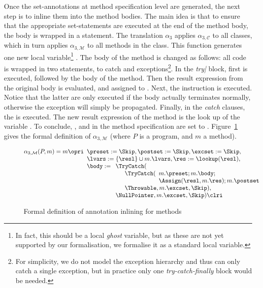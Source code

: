 Once the set-annotations at method specification level are generated,
the next step is to inline them into the method bodies.  The main
idea is that to ensure that the appropriate set-statements are
executed at the end of the method body, the body is wrapped in a
\TryCatch statement. The translation \(\alpha_3\) applies
\(\alpha_{3, \mathcal{C}}\) to all classes, which in turn applies
\(\alpha_{3, \mathcal{M}}\) to all methods in the class. This function
generates one new local variable\footnote{In fact, this should be a
local \emph{ghost} variable, but as these are not yet supported by our
formalisation, we formalise it as a standard local variable.}
\resl. The body of the method is changed as follows: 
all code is wrapped in two \TryCatch statements, to catch \Throwable
and \NullPointer exceptions\footnote{For simplicity, we do not model
the exception hierarchy and thus \TryCatch can only catch a single
exception, but in practice only one \emph{try-catch-finally} block
would be needed.}. In the \emph{try|} block, first \preset is
executed, followed by the body of the method. Then the result
expression from the original body is evaluated, and assigned to
\resl. Next, the \postset instruction is executed. Notice that the latter
are only executed if the body actually terminates normally, otherwise
the exception will simply be propagated. Finally, in the \emph{catch}
clauses, the \excset is executed. The new result expression of the method
is the look up of the variable \resl. To conclude, \preset,
\postset and
\excset in the method specification are set to
\Skip. Figure~\ref{FigInline} gives the formal definition of
\(\alpha_{3, \mathcal{M}}\) (where \(P\) is a program, and \(m\) a method).

\begin{figure}[t]
\[
\alpha_{3, \mathcal{M}}(P, m) = m \opri
\begin{array}[t]{l}
\preset := \Skip, \postset := \Skip, \excset := \Skip,\\
\lvars := \{\resl\} \cup m.\lvars,
\res := \lookup(\resl), \\
\body :=
\begin{array}[t]{l}
\TryCatch(\\
\quad \begin{array}[t]{l}
  \TryCatch(
  \begin{array}[t]{l}
   m.\preset; m.\body; \\ \Assign(\resl, m.\res); m.\postset\\
  \end{array}\\
  \Throwable, m.\excset, \Skip),
\end{array}\\
\NullPointer, m.\excset, \Skip) \clri
\end{array}
\end{array}
\]
\caption{Formal definition of annotation inlining for methods}\label{FigInline}
\end{figure}


